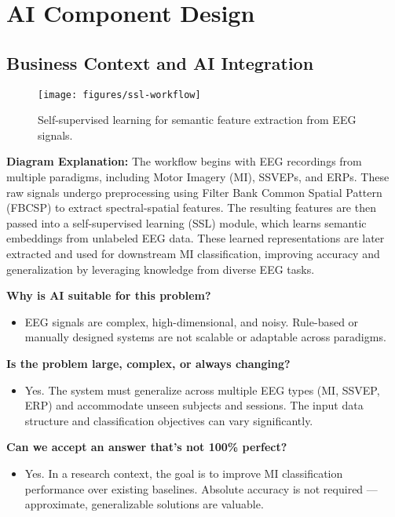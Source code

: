 \chapter{AI Component Design}
\label{ch:ai-component-design}

\section{Business Context and AI Integration}
\label{sec:business-context}

\begin{figure}[h]
    \centering
    \texttt{[image: figures/ssl-workflow]}
    \caption{Self-supervised learning for semantic feature extraction from EEG signals.}
    \label{fig:ssl-workflow}
\end{figure}
\noindent

\vspace{1em}
\noindent\textbf{Diagram Explanation:}
The workflow begins with EEG recordings from multiple paradigms, including Motor Imagery (MI), SSVEPs, and ERPs. These raw signals undergo preprocessing using Filter Bank Common Spatial Pattern (FBCSP) to extract spectral-spatial features.
The resulting features are then passed into a self-supervised learning (SSL) module, which learns semantic embeddings from unlabeled EEG data.
These learned representations are later extracted and used for downstream MI classification, improving accuracy and generalization by leveraging knowledge from diverse EEG tasks.
\pagebreak

\vspace{1em}
\noindent\textbf{Why is AI suitable for this problem?}
\begin{itemize}
    \item EEG signals are complex, high-dimensional, and noisy.
    Rule-based or manually designed systems are not scalable or adaptable across paradigms.
\end{itemize}

\vspace{0.5em}
\noindent\textbf{Is the problem large, complex, or always changing?}
\begin{itemize}
    \item Yes.
    The system must generalize across multiple EEG types (MI, SSVEP, ERP) and accommodate unseen subjects and sessions.
    The input data structure and classification objectives can vary significantly.
\end{itemize}

\vspace{0.5em}
\noindent\textbf{Can we accept an answer that’s not 100\% perfect?}
\begin{itemize}
    \item Yes.
    In a research context, the goal is to improve MI classification performance over existing baselines.
    Absolute accuracy is not required — approximate, generalizable solutions are valuable.
\end{itemize}

